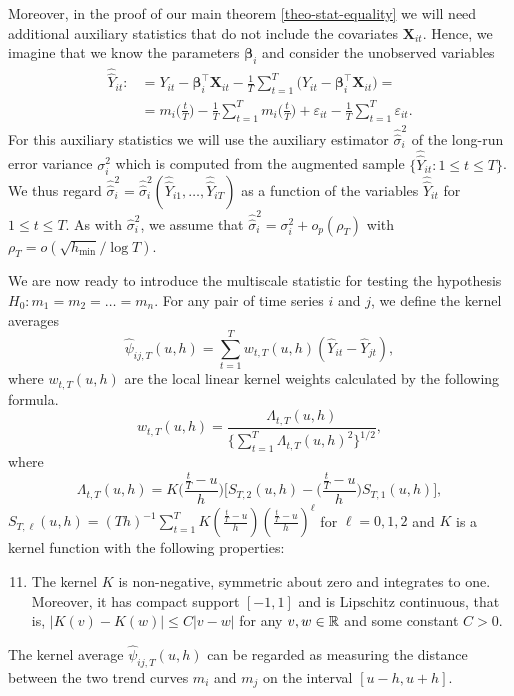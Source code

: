 \documentclass[a4paper,12pt]{article}
\newcommand{\doublehattwo}[1]{\widehat{\widehat{#1}}}
\begin{document}
Moreover, in the proof of our main theorem \ref{theo-stat-equality} we will need additional auxiliary statistics that do not include the covariates $\mathbf{X}_{it}$. Hence, we imagine that we know the parameters $\bm{\beta}_i$ and consider the unobserved variables 
\begin{align*}
\doublehattwo{Y}_{it} :&= Y_{it} - \bm{\beta}_i^\top \mathbf{X}_{it} -  \frac{1}{T}\sum_{t=1}^T \big(Y_{it} - \bm{\beta}_i^\top \mathbf{X}_{it}\big) =\\
&=m_i \Big( \frac{t}{T} \Big)  - \frac{1}{T}\sum_{t=1}^T  m_i \Big( \frac{t}{T} \Big) + \varepsilon_{it} - \frac{1}{T}\sum_{t=1}^T \varepsilon_{it}.
\end{align*}
For this auxiliary statistics we will use the auxiliary estimator $\doublehattwo{\sigma}_i^2$ of the long-run error variance $\sigma_i^2$ which is computed from the augmented sample $\{ \doublehattwo{Y}_{it}: 1 \le t \le T \}$. We thus regard $\doublehattwo{\sigma}_i^2 = \doublehattwo{\sigma}_i^2(\doublehattwo{Y}_{i1},\ldots,\doublehattwo{Y}_{iT})$ as a function of the variables $\doublehattwo{Y}_{it}$ for $1 \le t \le T$. As with $\widehat{\sigma}_i^2$, we assume that $\doublehattwo{\sigma}_i^2 = \sigma^2_i + o_p(\rho_T)$ with $\rho_T = o(\sqrt{h_{\min}}/\log T)$.

We are now ready to introduce the multiscale statistic for testing the hypothesis $H_0: m_1 = m_2 = \ldots = m_n$. For any pair of time series $i$ and $j$, we define the kernel averages
\[ \widehat{\psi}_{ij,T}(u,h) = \sum\limits_{t=1}^T w_{t,T}(u,h)(\widehat{Y}_{it} - \widehat{Y}_{jt}), \]
where $w_{t,T}(u,h)$ are the local linear kernel weights calculated by the following formula.
\begin{equation}\label{weights}
w_{t,T}(u,h) = \frac{\Lambda_{t,T}(u,h)}{ \{\sum\nolimits_{t=1}^T \Lambda_{t,T}(u,h)^2 \}^{1/2} }, 
\end{equation}
where
\[ \Lambda_{t,T}(u,h) = K\Big(\frac{\frac{t}{T}-u}{h}\Big) \Big[ S_{T,2}(u,h) - \Big(\frac{\frac{t}{T}-u}{h}\Big) S_{T,1}(u,h) \Big], \]
$S_{T,\ell}(u,h) = (Th)^{-1} \sum\nolimits_{t=1}^T K(\frac{\frac{t}{T}-u}{h}) (\frac{\frac{t}{T}-u}{h})^\ell$ for $\ell = 0,1,2$ and $K$ is a kernel function with the following properties: 
\begin{enumerate}[label=(C\arabic*),leftmargin=1.05cm]
\setcounter{enumi}{10}
\item \label{C-ker} The kernel $K$ is non-negative, symmetric about zero and integrates to one. Moreover, it has compact support $[-1,1]$ and is Lipschitz continuous, that is, $|K(v) - K(w)| \le C |v-w|$ for any $v,w \in \mathbb{R}$ and some constant $C > 0$. 
\end{enumerate} 
The kernel average $\widehat{\psi}_{ij,T}(u,h)$ can be regarded as measuring the distance between the two trend curves $m_i$ and $m_j$ on the interval $[u-h,u+h]$.
\end{document}
